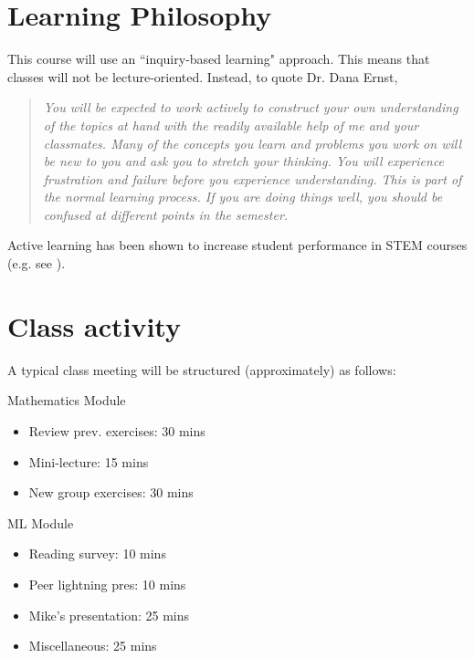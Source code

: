 \documentclass[letterpaper]{inzane_syllabus} %
\begin{document}


\vspace{0.2cm} 
\section{Learning Philosophy}

This course will use an ``inquiry-based learning" approach. This means that classes will not be lecture-oriented. Instead, to quote Dr. Dana Ernst,

\begin{quotation}
\textit{You will be expected to work actively to construct your own understanding of the topics at hand with the readily available help of me and your classmates. Many of the concepts you learn and problems you work on will be new to you and ask you to stretch your thinking. You will experience frustration and failure before you experience understanding. This is part of the normal learning process. If you are doing things well, you should be confused at different points in the semester.}
\end{quotation}

Active learning has been shown to increase student performance in STEM courses (e.g. see \cite{deslauriers2011improved, freeman2014active}). 

\vspace{0.2cm}
\section{Class activity}

A typical class meeting will be  structured (approximately) as follows:

\noindent
\begin{minipage}{0.45\textwidth}
Mathematics Module
\begin{itemize}
\item Review prev. exercises: 30 mins
\item Mini-lecture: 15 mins
\item New group exercises: 30 mins	
\end{itemize}
\end{minipage}
\hfill
\begin{minipage}{0.45\textwidth}
ML Module
\begin{itemize}
\item Reading survey: 10 mins
\item Peer lightning pres: 10 mins
\item Mike's presentation: 25 mins
\item Miscellaneous: 25 mins
\end{itemize}
\end{minipage}
\end{document}
